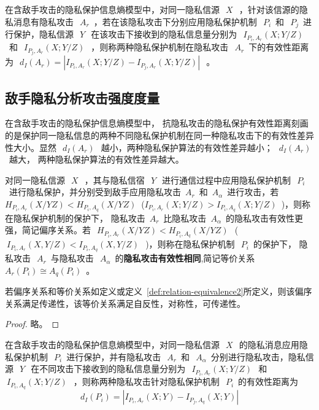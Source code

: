 \begin{definition}[抗隐私攻击的隐私保护有效性距离]
	\label{def:privacy-preserving-performance-distance}
	在含敌手攻击的隐私保护信息熵模型中，对同一隐私信源~$~X~$~，针对该信源的隐私消息有隐私攻击~$~A_{r}$~，若在该隐私攻击下分别应用隐私保护机制~$~P_{i}$~和~$~P_{j}$~进行保护，隐私信源~$~Y~$~在该攻击下接收到的隐私信息量分别为~$~I_{P_{i},A_{r}}(X;Y/Z)~$~和~$~I_{P_{j},A_{r}}(X;Y/Z)~$~，则称两种隐私保护机制在隐私攻击~$~A_{r}$~下的有效性距离为~$~d_{I}(A_{r})=\left | I_{P_{i},A_{r}}(X;Y/Z)-I_{P_{j},A_{r}}(X;Y/Z) \right |~$~。
\end{definition}

\subsection{敌手隐私分析攻击强度度量}
在含敌手攻击的隐私保护信息熵模型中， 抗隐私攻击的隐私保护有效性距离刻画的是保护同一隐私信息的两种不同隐私保护机制在同一种隐私攻击下的有效性差异性大小。显然~$~d_{I}(A_{r})~$~越小，两种隐私保护算法的有效性差异越小；~$~d_{I}(A_{r})~$~越大， 两种隐私保护算法的有效性差异越大。

\begin{definition}
	\label{def:relation-equivalence2}
	 对同一隐私信源~$~X~$~，其与隐私信宿~$~Y~$~进行通信过程中应用隐私保护机制~$~P_{i}$~进行隐私保护，并分别受到敌手应用隐私攻击~$A_{r}$~和~$A_{\alpha }$~进行攻击，若~${{H}_{{{P}_{i}},{{A}_{r}}}}(X/YZ)<{{H}_{{{P}_{i}},{{A}_{q}}}}(X/YZ)~$ (${{I}_{{{P}_{i}},{{A}_{r}}}}(X;Y/Z)>{{I}_{{{P}_{i}},{{A}_{q}}}}(X;Y/Z)$~)，则称在隐私保护机制的保护下， 隐私攻击~$A_{r}$~比隐私攻击~$A_{\alpha }$~的隐私攻击有效性更强，简记偏序关系。若~$~H_{P_{i},A_{r}}(X/YZ)<H_{P_{i},A_{q}}(X/YZ)~$~(~$~I_{P_{i},A_{r}}(X,Y/Z)<I_{P_{i},A_{q}}(X,Y/Z)~$~)，则称在隐私保护机制~$~P_{i}$~的保护下， 隐私攻击~$~A_{r}$~与隐私攻击~$~A_{\alpha }$~的\textbf{隐私攻击有效性相同},简记等价关系~$A_{r}(P_{i})\cong A_{q}(P_{i})$~。
\end{definition}

\begin{theorem}
	\label{thm:relation-equivalence}
	若偏序关系和等价关系如定义\label{def:relation-equivalence1}或定义~\ref{def:relation-equivalence2}所定义，则该偏序关系满足传递性，该等价关系满足自反性，对称性，可传递性。 
\end{theorem}

\begin{proof}
 略。
\end{proof}


\begin{definition}[隐私攻击有效性距离]
	\label{def:privacy-attack-distance}
	在含敌手攻击的隐私保护信息熵模型中，对同一隐私信源~$~X~$~的隐私消息应用隐私保护机制~$~P_{i}$~进行保护，并有隐私攻击~$~A_{r}$~和~$~A_{\alpha}$~分别进行隐私攻击，隐私信源~$~Y~$~在不同攻击下接收到的隐私信息量分别为~$~I_{P_{i},A_{r}}(X;Y/Z)~$~和~$~I_{P_{i},A_{q}}(X;Y/Z)~$~，则称两种隐私攻击针对隐私保护机制~$~P_{i}$~的有效性距离为
\begin{equation}
d_{I}(P_{i})=\left | I_{P_{i},A_{r}}(X;Y)-I_{P_{j},A_{q}}(X;Y) \right |
\end{equation}
\end{definition}


